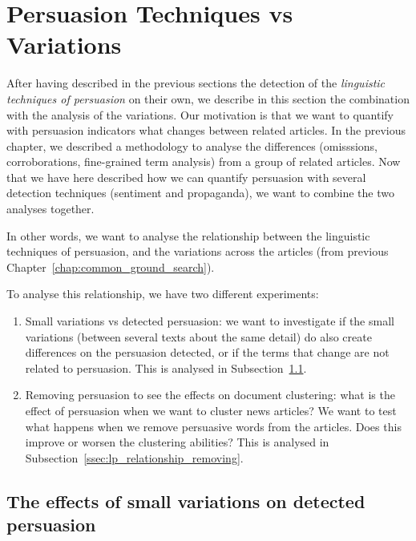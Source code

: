 \section{\statusgreen Persuasion Techniques vs Variations}
\label{sec:lp_relationship}

After having described in the previous sections the detection of the \emph{linguistic techniques of persuasion} on their own, we describe in this section the combination with the analysis of the variations.
Our motivation is that we want to quantify with persuasion indicators what changes between related articles.
In the previous chapter, we described a methodology to analyse the differences (omisssions, corroborations, fine-grained term analysis) from a group of related articles.
Now that we have here described how we can quantify persuasion with several detection techniques (sentiment and propaganda), we want to combine the two analyses together.

In other words, we want to analyse the relationship between the linguistic techniques of persuasion, and the variations across the articles (from previous Chapter~\ref{chap:common_ground_search}).

To analyse this relationship, we have two different experiments:

\begin{enumerate}
    \item Small variations vs detected persuasion: we want to investigate if the small variations (between several texts about the same detail) do also create differences on the persuasion detected, or if the terms that change are not related to persuasion. This is analysed in Subsection~\ref{ssec:lp_relationship_small_variations}.
    \item Removing persuasion to see the effects on document clustering: what is the effect of persuasion when we want to cluster news articles? We want to test what happens when we remove persuasive words from the articles. Does this improve or worsen the clustering abilities? This is analysed in Subsection~\ref{ssec:lp_relationship_removing}. %
\end{enumerate}

\subsection{\statusgreen The effects of small variations on detected persuasion}
\label{ssec:lp_relationship_small_variations}

